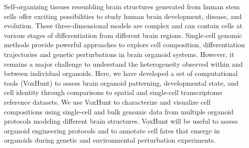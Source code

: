 Self-organizing tissues resembling brain structures generated from human stem cells offer exciting possibilities to study human brain development, disease, and evolution. These three-dimensional models are complex and can contain cells at various stages of differentiation from different brain regions. Single-cell genomic methods provide powerful approaches to explore cell composition, differentiation trajectories and genetic perturbations in brain organoid systems. However, it remains a major challenge to understand the heterogeneity observed within and between individual organoids. Here, we have developed a set of computational tools (VoxHunt) to assess brain organoid patterning, developmental state, and cell identity through comparisons to spatial and single-cell transcriptome reference datasets. We use VoxHunt to characterize and visualize cell compositions using single-cell and bulk genomic data from multiple organoid protocols modeling different brain structures. VoxHunt will be useful to assess organoid engineering protocols and to annotate cell fates that emerge in organoids during genetic and environmental perturbation experiments.

